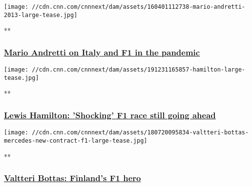 \href{/videos/sports/2020/04/15/mario-andretti-italy-coronavirus-crisis-formula-one-f1-motorsport-spt-intl.cnn}{}

\texttt{[image: //cdn.cnn.com/cnnnext/dam/assets/160401112738-mario-andretti-2013-large-tease.jpg]}

**

\hypertarget{mario-andretti-on-italy-and-f1-in-the-pandemic}{%
\subsubsection{\texorpdfstring{\href{/videos/sports/2020/04/15/mario-andretti-italy-coronavirus-crisis-formula-one-f1-motorsport-spt-intl.cnn}{Mario
Andretti on Italy and F1 in the
pandemic}}{Mario Andretti on Italy and F1 in the pandemic}}\label{mario-andretti-on-italy-and-f1-in-the-pandemic}}

\href{/videos/sports/2020/03/12/lewis-hamilton-shocking-formula-one-australia-sot-mercedes-nba-trump-spt-intl.cnn}{}

\texttt{[image: //cdn.cnn.com/cnnnext/dam/assets/191231165857-hamilton-large-tease.jpg]}

**

\hypertarget{lewis-hamilton-shocking-f1-race-still-going-ahead}{%
\subsubsection{\texorpdfstring{\href{/videos/sports/2020/03/12/lewis-hamilton-shocking-formula-one-australia-sot-mercedes-nba-trump-spt-intl.cnn}{Lewis
Hamilton: 'Shocking' F1 race still going
ahead}}{Lewis Hamilton: 'Shocking' F1 race still going ahead}}\label{lewis-hamilton-shocking-f1-race-still-going-ahead}}

\href{/videos/sports/2018/09/21/valtteri-bottas-mercedes-finland-special-formula-one-f1-circuit-vision-spt-intl.cnn}{}

\texttt{[image: //cdn.cnn.com/cnnnext/dam/assets/180720095834-valtteri-bottas-mercedes-new-contract-f1-large-tease.jpg]}

**

\hypertarget{valtteri-bottas-finlands-f1-hero}{%
\subsubsection{\texorpdfstring{\href{/videos/sports/2018/09/21/valtteri-bottas-mercedes-finland-special-formula-one-f1-circuit-vision-spt-intl.cnn}{Valtteri
Bottas: Finland's F1
hero}}{Valtteri Bottas: Finland's F1 hero}}\label{valtteri-bottas-finlands-f1-hero}}

